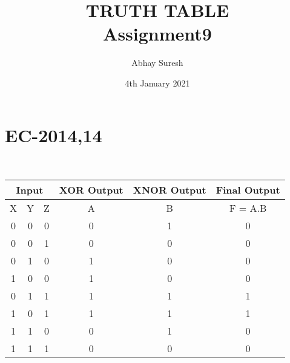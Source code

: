 \documentclass{article}
\title{TRUTH TABLE \\Assignment9}
\author{Abhay Suresh}
\date{4th January 2021}
\begin{document}
\maketitle
\section {EC-2014,14}
\\
\begin{center}
\begin{tabular}{ |c|c|c|c|c|c| } 
\hline
\multicolumn{3}{|c|}{Input}&{XOR Output}&{XNOR Output}&{Final Output}\\
\hline
X&Y&Z&A&B&F = A.B\\
\hline
0&0&0&0&1&0\\
0&0&1&0&0&0\\
0&1&0&1&0&0\\
1&0&0&1&0&0\\
0&1&1&1&1&1\\
1&0&1&1&1&1\\
1&1&0&0&1&0\\
1&1&1&0&0&0\\
\hline
\end{tabular}
\end{center}
\end{document}

